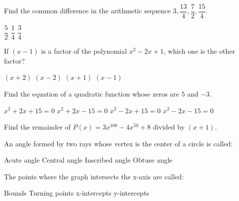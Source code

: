 \begin{questions}
\question Find the common difference in the arithmetic sequence $3, \dfrac{13}{4}, \dfrac{7}{2}, \dfrac{15}{4}$. 
\begin{multicols}{4}
\begin{choices}  
\choice $\dfrac{5}{2}$ 
\CorrectChoice $\dfrac{1}{4}$ 
\choice $\dfrac{3}{4}$ 
\end{choices}
\end{multicols} 

\question If $(x-1)$ is a factor of the polynomial $x^2 - 2x + 1$, which one is the other factor?
\begin{multicols}{4}
\begin{choices}  
\choice $(x+2)$
\choice $(x-2)$
\choice $(x+1)$
\CorrectChoice $(x-1)$
\end{choices}
\end{multicols}

\question Find the equation of a quadratic function whose zeros are $5$ and $-3$. 
\begin{multicols}{4}
\begin{choices}  
\choice $x^{2} + 2 x + 15=0$
\choice $x^{2} + 2 x - 15=0$
\choice $x^{2} - 2 x + 15=0$
\CorrectChoice $x^{2} - 2 x - 15=0$
\end{choices}
\end{multicols} 

\question Find the remainder of  $P(x) = 3x^{100} -4x^{50} + 8$  divided by $(x + 1)$.
\begin{multicols}{4}
\begin{choices}  
\end{choices}
\end{multicols} 

\question An angle formed by two rays whose vertex is the center of a circle is called: 

\begin{multicols}{4}
\begin{choices}  
\choice Acute angle
\CorrectChoice Central angle
\choice Inscribed angle
\choice  Obtuse angle
\end{choices}
\end{multicols}

\question The points where the graph intersects the x-axis are called: 
\begin{multicols}{4}
\begin{choices}  
\choice Bounds
\choice Turning points
\CorrectChoice x-intercepts
\choice  y-intercepts 
\end{choices}
\end{multicols}


\end{questions}
